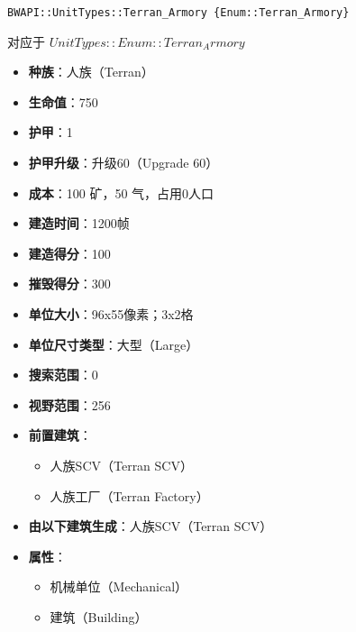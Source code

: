 \begin{tcolorbox}[colback=white, colframe=black!60!white, title=Terran\_Armory(), arc=0mm]
    \begin{verbatim}
BWAPI::UnitTypes::Terran_Armory {Enum::Terran_Armory}
    \end{verbatim}
    对应于  $ UnitTypes::Enum::Terran_Armory $ 
    \begin{itemize}
        \item \textbf{种族}：人族（Terran）
        \item \textbf{生命值}：750
        \item \textbf{护甲}：1
        \item \textbf{护甲升级}：升级60（Upgrade 60）
        \item \textbf{成本}：100 矿，50 气，占用0人口
        \item \textbf{建造时间}：1200帧
        \item \textbf{建造得分}：100
        \item \textbf{摧毁得分}：300
        \item \textbf{单位大小}：96x55像素；3x2格
        \item \textbf{单位尺寸类型}：大型（Large）
        \item \textbf{搜索范围}：0
        \item \textbf{视野范围}：256
        \item \textbf{前置建筑}：
            \begin{itemize}
                \item 人族SCV（Terran SCV）
                \item 人族工厂（Terran Factory）
            \end{itemize}
        \item \textbf{由以下建筑生成}：人族SCV（Terran SCV）
        \item \textbf{属性}：
            \begin{itemize}
                \item 机械单位（Mechanical）
                \item 建筑（Building）
            \end{itemize}
    \end{itemize}
    
\end{tcolorbox}

